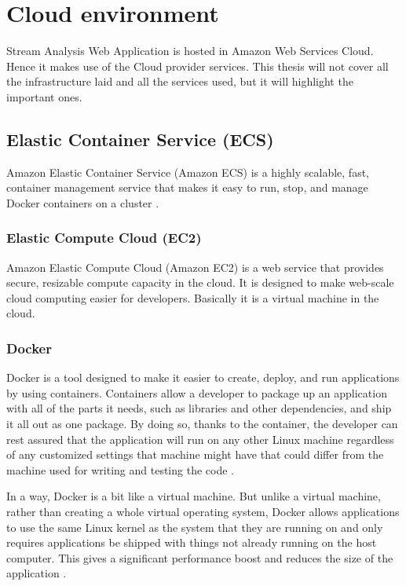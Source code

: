 \section{Cloud environment}
\label{chap:04:03}

Stream Analysis Web Application is hosted in Amazon Web Services Cloud. Hence it makes use of the Cloud provider services. This thesis will not cover all the infrastructure laid and all the services used, but it will highlight the important ones.

\subsection{Elastic Container Service (ECS)}
\label{chap:04:03:01}

Amazon Elastic Container Service (Amazon ECS) is a highly scalable, fast, container management service that makes it easy to run, stop, and manage Docker containers on a cluster \cite{aws-ecs}\cite{aws-book1}.

\subsubsection{Elastic Compute Cloud (EC2)}
\label{chap:04:03:01:01}

Amazon Elastic Compute Cloud (Amazon EC2) is a web service that provides secure, resizable compute capacity in the cloud. It is designed to make web-scale cloud computing easier for developers.\cite{aws-ec2} Basically it is a virtual machine in the cloud.

\subsubsection{Docker}
\label{chap:04:03:01:02}

Docker is a tool designed to make it easier to create, deploy, and run applications by using containers. Containers allow a developer to package up an application with all of the parts it needs, such as libraries and other dependencies, and ship it all out as one package. By doing so, thanks to the container, the developer can rest assured that the application will run on any other Linux machine regardless of any customized settings that machine might have that could differ from the machine used for writing and testing the code \cite{docker-description}.

In a way, Docker is a bit like a virtual machine. But unlike a virtual machine, rather than creating a whole virtual operating system, Docker allows applications to use the same Linux kernel as the system that they are running on and only requires applications be shipped with things not already running on the host computer. This gives a significant performance boost and reduces the size of the application \cite{docker-description}.


